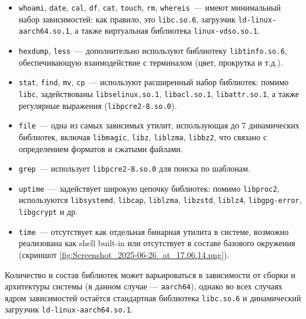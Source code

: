 \begin{itemize}
    \item \texttt{whoami}, \texttt{date}, \texttt{cal}, \texttt{df}, \texttt{cat}, \texttt{touch}, \texttt{rm}, \texttt{whereis}~--- имеют минимальный набор зависимостей: как правило, это \texttt{libc.so.6}, загрузчик \texttt{ld-linux-aarch64.so.1}, а также виртуальная библиотека \texttt{linux-vdso.so.1}.

    \item \texttt{hexdump}, \texttt{less}~--- дополнительно используют библиотеку \texttt{libtinfo.so.6}, обеспечивающую взаимодействие с терминалом (цвет, прокрутка и т.д.).

    \item \texttt{stat}, \texttt{find}, \texttt{mv}, \texttt{cp}~--- используют расширенный набор библиотек: помимо \texttt{libc}, задействованы \texttt{libselinux.so.1}, \texttt{libacl.so.1}, \texttt{libattr.so.1}, а также регулярные выражения (\texttt{libpcre2-8.so.0}).

    \item \texttt{file}~— одна из самых зависимых утилит, использующая до 7 динамических библиотек, включая \texttt{libmagic}, \texttt{libz}, \texttt{liblzma}, \texttt{libbz2}, что связано с определением форматов и сжатыми файлами.

    \item \texttt{grep}~— использует \texttt{libpcre2-8.so.0} для поиска по шаблонам.

    \item \texttt{uptime}~— задействует широкую цепочку библиотек: помимо \texttt{libproc2}, используются \texttt{libsystemd}, \texttt{libcap}, \texttt{liblzma}, \texttt{libzstd}, \texttt{liblz4}, \texttt{libgpg-error}, \texttt{libgcrypt} и др.

    \item \texttt{time}~— отсутствует как отдельная бинарная утилита в системе, возможно реализована как shell built-in или отсутствует в составе базового окружения (скриншот \ref{fig:Screenshot_2025-06-26_at_17.06.14.png}).
\end{itemize}


Количество и состав библиотек может варьироваться в зависимости от сборки и архитектуры системы (в данном случае — \texttt{aarch64}), однако во всех случаях ядром зависимостей остаётся стандартная библиотека \texttt{libc.so.6} и динамический загрузчик \texttt{ld-linux-aarch64.so.1}.

